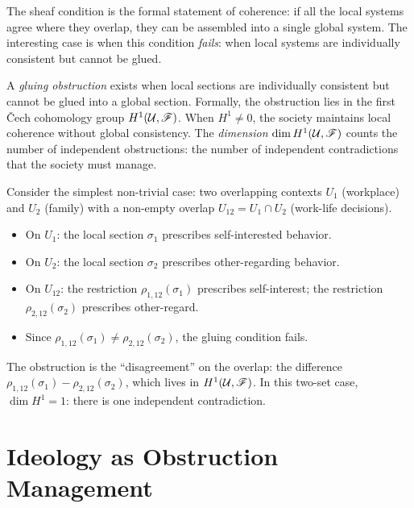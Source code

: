 The sheaf condition is the formal statement of coherence: if all the local systems agree where they overlap, they can be assembled into a single global system.
The interesting case is when this condition \emph{fails}: when local systems are individually consistent but cannot be glued.

\begin{definition}
\label{def:obstruction}
A \emph{gluing obstruction} exists when local sections are individually consistent but cannot be glued into a global section.
Formally, the obstruction lies in the first \v{C}ech cohomology group $H^1(\mathcal{U}, \mathscr{F})$.
When $H^1 \neq 0$, the society maintains local coherence without global consistency.
The \emph{dimension} $\dim H^1(\mathcal{U}, \mathscr{F})$ counts the number of independent obstructions: the number of independent contradictions that the society must manage.
\end{definition}

\begin{example}
\label{ex:obstruction-computation}
Consider the simplest non-trivial case: two overlapping contexts $U_1$ (workplace) and $U_2$ (family) with a non-empty overlap $U_{12} = U_1 \cap U_2$ (work-life decisions).
\begin{itemize}[nosep]
  \item On $U_1$: the local section $\sigma_1$ prescribes self-interested behavior.
  \item On $U_2$: the local section $\sigma_2$ prescribes other-regarding behavior.
  \item On $U_{12}$: the restriction $\rho_{1,12}(\sigma_1)$ prescribes self-interest; the restriction $\rho_{2,12}(\sigma_2)$ prescribes other-regard.
  \item Since $\rho_{1,12}(\sigma_1) \neq \rho_{2,12}(\sigma_2)$, the gluing condition fails.
\end{itemize}
The obstruction is the ``disagreement'' on the overlap: the difference $\rho_{1,12}(\sigma_1) - \rho_{2,12}(\sigma_2)$, which lives in $H^1(\mathcal{U}, \mathscr{F})$.
In this two-set case, $\dim H^1 = 1$: there is one independent contradiction.
\end{example}


\section{Ideology as Obstruction Management}
\label{sec:ch12-ideology}

